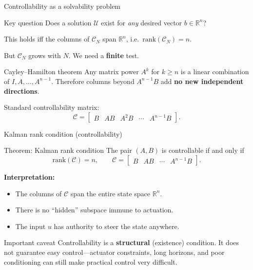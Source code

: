 \documentclass[aspectratio=169,10pt]{beamer}
\newcommand{\R}{\mathbb{R}}
\newcommand{\Ccal}{\mathcal{C}}
\begin{document}
\begin{frame}{Controllability as a solvability problem}
\begin{alertbox}{Key question}
Does a solution $\mathcal{U}$ exist for \emph{any} desired vector
$b\in\R^n$?
\end{alertbox}

This holds iff the columns of $\Ccal_N$ span $\R^n$, i.e.\
$\mathrm{rank}(\Ccal_N)=n$.

But $\Ccal_N$ grows with $N$.  We need a \textbf{finite} test.

\begin{notebox}{Cayley--Hamilton theorem}
Any matrix power $A^k$ for $k\ge n$ is a linear combination of
$I,A,\ldots,A^{n-1}$.  Therefore columns beyond $A^{n-1}B$ add \textbf{no
new independent directions}.
\end{notebox}

Standard controllability matrix:
\[
\Ccal = \begin{bmatrix}
B & AB & A^2B & \cdots & A^{n-1}B
\end{bmatrix}.
\]
\end{frame}

\begin{frame}{Kalman rank condition (controllability)}
\begin{alertbox}{Theorem: Kalman rank condition}
The pair $(A,B)$ is controllable if and only if
\[
\mathrm{rank}(\Ccal)=n,
\qquad
\Ccal=\begin{bmatrix}B & AB & \cdots & A^{n-1}B\end{bmatrix}.
\]
\end{alertbox}

\textbf{Interpretation:}
\begin{itemize}
  \item The columns of $\Ccal$ span the entire state space $\R^n$.
  \item There is no ``hidden'' subspace immune to actuation.
  \item The input $u$ has authority to steer the state anywhere.
\end{itemize}

\begin{notebox}{Important caveat}
Controllability is a \textbf{structural} (existence) condition.  It does not
guarantee easy control---actuator constraints, long horizons, and poor
conditioning can still make practical control very difficult.
\end{notebox}
\end{frame}
\end{document}
